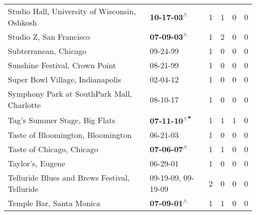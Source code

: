 \begin{supertabular}{p{0.4\textwidth}p{0.3\textwidth}p{0.05\textwidth}p{0.05\textwidth}p{0.05\textwidth}p{0.05\textwidth}}
                                Studio Hall, University of Wisconsin, Oshkosh &                                                 \textbf{10-17-03\textsuperscript{$\wedge$}} &  1 &  1 &  0 &  0 \\
                                                      Studio Z, San Francisco &                                                 \textbf{07-09-03\textsuperscript{$\wedge$}} &  1 &  2 &  0 &  0 \\
                                                        Subterranean, Chicago &                                                                  09-24-99\textsuperscript{} &  1 &  0 &  0 &  0 \\
                                               Sunshine Festival, Crown Point &                                                                  08-21-99\textsuperscript{} &  1 &  0 &  0 &  0 \\
                                             Super Bowl Village, Indianapolis &                                                                  02-04-12\textsuperscript{} &  1 &  0 &  0 &  0 \\
                                   Symphony Park at SouthPark Mall, Charlotte &                                                                  08-10-17\textsuperscript{} &  1 &  0 &  0 &  0 \\
                                                Tag's Summer Stage, Big Flats &                                                \textbf{07-11-10\textsuperscript{$\wedge$*}} &  1 &  1 &  1 &  0 \\
                                            Taste of Bloomington, Bloomington &                                                                  06-21-03\textsuperscript{} &  1 &  0 &  0 &  0 \\
                                                    Taste of Chicago, Chicago &                                                 \textbf{07-06-07\textsuperscript{$\wedge$}} &  1 &  1 &  0 &  0 \\
                                                             Taylor's, Eugene &                                                                  06-29-01\textsuperscript{} &  1 &  0 &  0 &  0 \\
                                Telluride Blues and Brews Festival, Telluride &                                      09-19-09\textsuperscript{}, 09-19-09\textsuperscript{} &  2 &  0 &  0 &  0 \\
                                                     Temple Bar, Santa Monica &                                                 \textbf{07-09-01\textsuperscript{$\wedge$}} &  1 &  1 &  0 &  0 \\

\end{supertabular}
